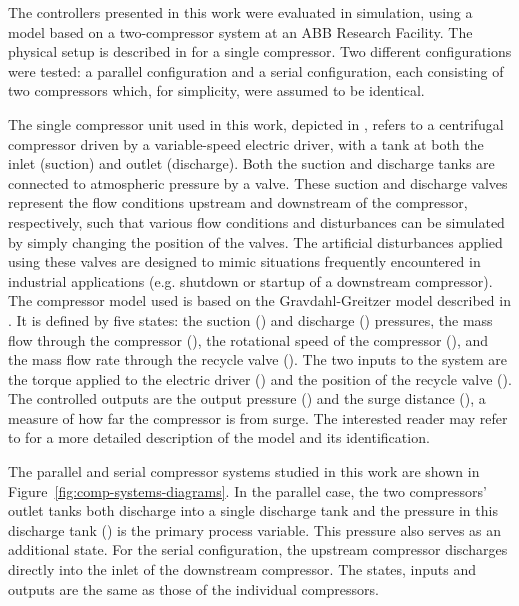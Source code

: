 The controllers presented in this work were evaluated in simulation, using a model based on a two-compressor system at an ABB Research Facility. 
The physical setup is described in \cite{Cortinovis2015} for a single compressor.
Two different configurations were tested: a parallel configuration and a serial configuration, each consisting of two compressors which, for simplicity, were assumed to be identical.

The single compressor unit used in this work, depicted in , refers to a centrifugal compressor driven by a variable-speed electric driver, with a tank at both the inlet (suction) and outlet (discharge).
Both the suction and discharge tanks are connected to atmospheric pressure by a valve.
These suction and discharge valves represent the flow conditions upstream and downstream of the compressor, respectively, such that various flow conditions and disturbances can be simulated by simply changing the position of the valves.
The artificial disturbances applied using these valves are designed to mimic situations frequently encountered in industrial applications (e.g. shutdown or startup of a downstream compressor).
The compressor model used is based on the Gravdahl-Greitzer model described in \cite{Gravdahl1999}. 
It is defined by five states: the suction () and discharge () pressures, the mass flow through the compressor (), the rotational speed of the compressor (), and the mass flow rate through the recycle valve ().
The two inputs to the system are the torque applied to the electric driver () and the position of the recycle valve ().
The controlled outputs are the output pressure () and the surge distance (), a measure of how far the compressor is from surge.
The interested reader may refer to \cite{Cortinovis2015} for a more detailed description of the model and its identification.

The parallel and serial compressor systems studied in this work are shown in Figure~\ref{fig:comp-systems-diagrams}.
In the parallel case, the two compressors' outlet tanks both discharge into a single discharge tank and the pressure in this discharge tank () is the primary process variable.
This pressure also serves as an additional state.
For the serial configuration, the upstream compressor discharges directly into the inlet of the downstream compressor.
The states, inputs and outputs are the same as those of the individual compressors.


